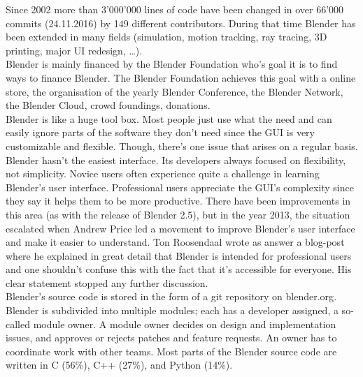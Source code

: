 Since 2002 more than 3'000'000 lines of code have been changed in over 66'000 commits (24.11.2016) by 149 different contributors.\cite{blender-repository} 
During that time Blender has been extended in many fields (simulation, motion tracking, ray tracing, 3D printing, major UI redesign, …). \\

Blender is mainly financed by the Blender Foundation who's goal it is to find ways to finance Blender.
The Blender Foundation achieves this goal with a online store\cite{blender-estore}, the organisation of the yearly Blender Conference\cite{blender-conference}, the Blender Network\cite{blender-network}, the Blender Cloud\cite{blender-cloud}, crowd foundings, donations\cite{blender-donate}. \\

Blender is like a huge tool box. 
Most people just use what the need and can easily ignore parts of the software they don't need since the GUI is very customizable and flexible. 
Though, there's one issue that arises on a regular basis. 
Blender hasn't the easiest interface. 
Its developers always focused on flexibility, not simplicity.
Novice users often experience quite a challenge in learning Blender's user interface.
Professional users appreciate the GUI's complexity since they say it helps them to be more productive.
There have been improvements in this area (as with the release of Blender 2.5), but in the year 2013, the situation escalated when Andrew Price led a movement to improve Blender's user interface and make it easier to understand.\cite{blender-guru-ui} 
Ton Roosendaal wrote as answer a blog-post\cite{blender-ton-ui} where he explained in great detail that Blender is intended for professional users and one shouldn't confuse this with the fact that it's accessible for everyone.
His clear statement stopped any further discussion. \\

Blender's source code is stored in the form of a git repository on blender.org\cite{blender-repository}.
Blender is subdivided into multiple modules; each has a developer assigned, a so-called module owner.\cite{blender-module-owners} A module owner decides on design and implementation issues, and approves or rejects patches and feature requests.\cite{blender-module-owner} 
An owner has to coordinate work with other teams.
Most parts of the Blender source code are written in C (56\%), C++ (27\%), and Python (14\%).\cite{blender-code-stat} \\

